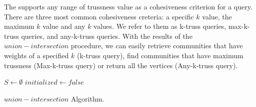The \twolevelindex{} supports any range of trussness value as a cohesiveness criterion for a query. There are three most common cohesiveness creteria: a specific $k$ value, the maximum $k$ value and any $k$ values. We refer to them as k-truss queries, max-k-truss queries, and any-k-truss queries. With the results of the $union-intersection$ procedure, we can easily retrieve communities that have weights of a specified $k$ (k-truss query), find communities that have maximum trussness (Max-k-truss query) or return all the vertices (Any-k-truss query).  

\begin{algorithm}
	\BlankLine
	$S \gets \emptyset$\;
	$initialized \gets false$\;
	\BlankLine
	\caption{$union-intersection$ Algorithm.}\label{alg:union_intersection}
\end{algorithm}


%


